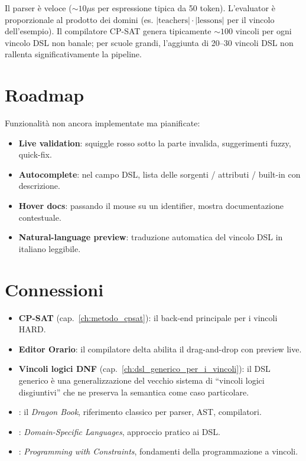 \begin{ideabox}
Il parser \`e veloce ($\sim 10\mu$s per espressione tipica
da 50 token). L'evaluator \`e proporzionale al prodotto dei
domini (es. $|\text{teachers}| \cdot |\text{lessons}|$ per il
vincolo dell'esempio). Il compilatore CP-SAT genera
tipicamente $\sim 100$ vincoli per ogni vincolo DSL non
banale; per scuole grandi, l'aggiunta di 20--30 vincoli DSL
non rallenta significativamente la pipeline.
\end{ideabox}

\section{Roadmap}

Funzionalit\`a non ancora implementate ma pianificate:
\begin{itemize}
\item \textbf{Live validation}: squiggle rosso sotto la
  parte invalida, suggerimenti fuzzy, quick-fix.
\item \textbf{Autocomplete}: nel campo DSL, lista delle
  sorgenti / attributi / built-in con descrizione.
\item \textbf{Hover docs}: passando il mouse su un
  identifier, mostra documentazione contestuale.
\item \textbf{Natural-language preview}: traduzione
  automatica del vincolo DSL in italiano leggibile.
\end{itemize}

\section{Connessioni}

\begin{connessionebox}
\begin{itemize}
\item \textbf{CP-SAT} (cap.~\ref{ch:metodo_cpsat}): il
  back-end principale per i vincoli HARD.
\item \textbf{Editor Orario}: il compilatore delta abilita
  il drag-and-drop con preview live.
\item \textbf{Vincoli logici DNF}
  (cap.~\ref{ch:dsl_generico_per_i_vincoli}): il DSL
  generico \`e una generalizzazione del vecchio sistema di
  ``vincoli logici disgiuntivi'' che ne preserva la
  semantica come caso particolare.
\end{itemize}
\end{connessionebox}

\begin{biblioparvabox}
\begin{itemize}
\item \cite{aho2006}: il \emph{Dragon Book}, riferimento
  classico per parser, AST, compilatori.
\item \cite{fowler2010}: \emph{Domain-Specific Languages},
  approccio pratico ai DSL.
\item \cite{marriott1998}: \emph{Programming with
  Constraints}, fondamenti della programmazione a
  vincoli.
\end{itemize}
\end{biblioparvabox}
